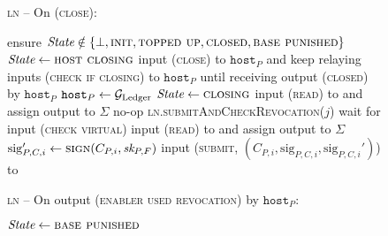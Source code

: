 \begin{figure}[H]
  \begin{processbox}{\textsc{ln} -- On (\textsc{close}):}
    \begin{algorithmic}[1]
      \State ensure $\itistate \notin \{\bot, \textsc{init}, \textsc{topped up},
      \textsc{closed}, \textsc{base punished}\}$ 
       
        \State $\itistate \gets \textsc{host closing}$
        \State input (\textsc{close}) to $\texttt{host}_P$ and keep relaying
        inputs (\textsc{check if closing}) to $\texttt{host}_P$ until receiving
        output (\textsc{closed}) by $\texttt{host}_P$
        \label{code:ln:close:relay}
        \State $\texttt{host}_P \gets \mathcal{G}_{\mathrm{Ledger}}$
      \EndIf
      \State $\itistate \gets \textsc{closing}$
      \State input (\textsc{read}) to \ledger and assign output to $\Sigma$
       
        \State no-op 
        \State \textsc{ln}.\textsc{submitAndCheckRevocation}($j$)
      \Else \: 
         
          \State wait for input (\textsc{check virtual}) 
          \State input (\textsc{read}) to \ledger and assign output to $\Sigma$
        \EndWhile
        \State $\mathrm{sig}_{P, C, i}' \gets \textsc{sign}(C_{P, i}, \textit{sk}_{P,
        F})$
        \State input (\textsc{submit}, $(C_{P, i}, \mathrm{sig}_{P, C, i},
        \mathrm{sig}_{P, C, i}')$) to \ledger
        \label{code:ln:close:submit}
      \EndIf
    \end{algorithmic}
  \end{processbox}
  \caption{}
  \label{code:ln:close}
\end{figure}

\begin{figure}
  \begin{processbox}{\textsc{ln} -- On output (\textsc{enabler used revocation})
  by $\texttt{host}_P$:}
    \begin{algorithmic}[1]
      \State $\itistate \gets \textsc{base punished}$
    \end{algorithmic}
  \end{processbox}
  \caption{}
  \label{code:ln:close}
\end{figure}
